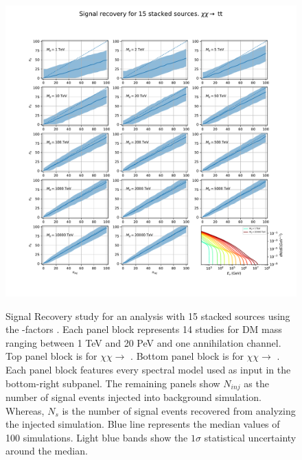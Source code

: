 \begin{figure}[t]
{        \includegraphics[clip, trim=1.5cm 2.0cm 1.0cm 3.5cm, scale=0.36]{figures/ic_DM/dm_plots/stact_tt_ninj_Masspanel.pdf}
    }\caption{Signal Recovery study for an analysis with 15 stacked sources using the \GS \J-factors \cite{Geringer_Sameth_2015}. Each panel block represents 14 studies for DM mass ranging between 1 TeV and 20 PeV and one annihilation channel. Top panel block is for $\chi\chi \rightarrow$ . Bottom panel block is for $\chi\chi \rightarrow$ . Each panel block features every spectral model used as input in the bottom-right subpanel. The remaining panels show $N_{inj}$ as the number of signal events injected into background simulation. Whereas, $N_s$ is the number of signal events recovered from analyzing the injected simulation. Blue line represents the median values of 100 simulations. Light blue bands show the $1\sigma$ statistical uncertainty around the median.}
    \label{fig:icDM_sigrecovery_1of2}
\end{figure}

